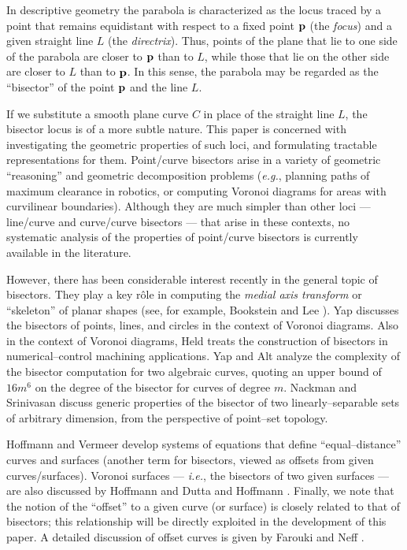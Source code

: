 In descriptive geometry \cite{coxeter69} the parabola is
characterized as the locus traced by a point that remains
equidistant with respect to a fixed point ${\bf p}$ (the
{\it focus\/}) and a given straight line $L$ (the {\it
directrix\/}). Thus, points of the plane that lie to one
side of the parabola are closer to ${\bf p}$ than to $L$,
while those that lie on the other side are closer to $L$
than to ${\bf p}$. In this sense, the parabola may be
regarded as the ``bisector'' of the point ${\bf p}$ and
the line $L$.

If we substitute a smooth plane curve $C$ in place of
the straight line $L$, the bisector locus is of a more
subtle nature. This paper is concerned with investigating
the geometric properties of such loci, and formulating
tractable representations for them. Point/curve bisectors
arise in a variety of geometric ``reasoning'' and geometric
decomposition problems ({\it e.g.}, planning paths of maximum
clearance in robotics, or computing Voronoi diagrams for areas
with curvilinear boundaries). Although they are much simpler
than other loci --- line/curve and curve/curve bisectors ---
that arise in these contexts, no systematic analysis of the
properties of point/curve bisectors is currently available
in the literature.

However, there has been considerable interest recently in
the general topic of bisectors. They play a key r\^ole in
computing the {\it medial axis transform\/} or ``skeleton''
of planar shapes (see, for example, Bookstein \cite{bookstein79}
and Lee \cite{lee82}). Yap \cite{yap87} discusses the bisectors
of points, lines, and circles in the context of Voronoi diagrams.
Also in the context of Voronoi diagrams, Held \cite{Held91}
treats the construction of bisectors in numerical--control
machining applications. Yap and Alt \cite{yap89} analyze
the complexity of the bisector computation for two algebraic
curves, quoting an upper bound of $16m^6$ on the degree of
the bisector for curves of degree $m$. Nackman and Srinivasan
\cite{nackman91} discuss generic properties of the bisector of
two linearly--separable sets of arbitrary dimension, from the
perspective of point--set topology.

Hoffmann and Vermeer \cite{HV91} develop systems of equations
that define ``equal--distance'' curves and surfaces (another
term for bisectors, viewed as offsets from given curves/surfaces).
Voronoi surfaces --- {\it i.e.}, the bisectors of two given
surfaces --- are also discussed by Hoffmann \cite{H90} and Dutta
and Hoffmann \cite{DH90}. Finally, we note that the notion of
the ``offset'' to a given curve (or surface) is closely related
to that of bisectors; this relationship will be directly exploited
in the development of this paper. A detailed discussion of offset
curves is given by Farouki and Neff \cite{farouki90a,farouki90b}.

